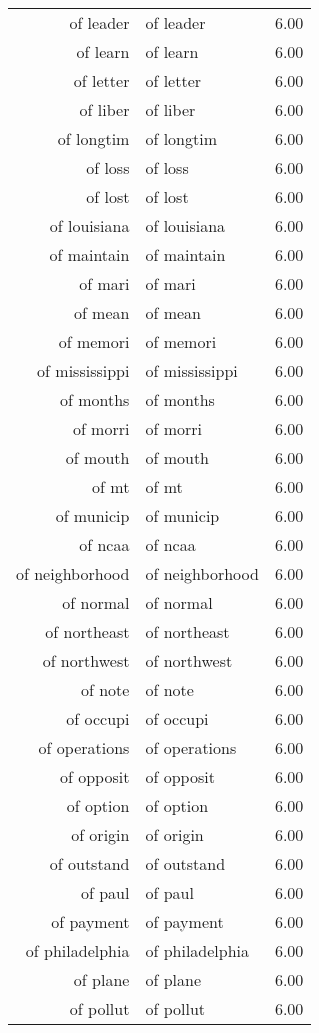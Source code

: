 \begin{table}[ht]
\begin{tabular}{rlr}
  of leader & of leader & 6.00 \\ 
  of learn & of learn & 6.00 \\ 
  of letter & of letter & 6.00 \\ 
  of liber & of liber & 6.00 \\ 
  of longtim & of longtim & 6.00 \\ 
  of loss & of loss & 6.00 \\ 
  of lost & of lost & 6.00 \\ 
  of louisiana & of louisiana & 6.00 \\ 
  of maintain & of maintain & 6.00 \\ 
  of mari & of mari & 6.00 \\ 
  of mean & of mean & 6.00 \\ 
  of memori & of memori & 6.00 \\ 
  of mississippi & of mississippi & 6.00 \\ 
  of months & of months & 6.00 \\ 
  of morri & of morri & 6.00 \\ 
  of mouth & of mouth & 6.00 \\ 
  of mt & of mt & 6.00 \\ 
  of municip & of municip & 6.00 \\ 
  of ncaa & of ncaa & 6.00 \\ 
  of neighborhood & of neighborhood & 6.00 \\ 
  of normal & of normal & 6.00 \\ 
  of northeast & of northeast & 6.00 \\ 
  of northwest & of northwest & 6.00 \\ 
  of note & of note & 6.00 \\ 
  of occupi & of occupi & 6.00 \\ 
  of operations & of operations & 6.00 \\ 
  of opposit & of opposit & 6.00 \\ 
  of option & of option & 6.00 \\ 
  of origin & of origin & 6.00 \\ 
  of outstand & of outstand & 6.00 \\ 
  of paul & of paul & 6.00 \\ 
  of payment & of payment & 6.00 \\ 
  of philadelphia & of philadelphia & 6.00 \\ 
  of plane & of plane & 6.00 \\ 
  of pollut & of pollut & 6.00 \\ 

\end{tabular}
\end{table}

